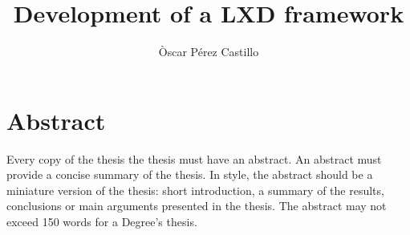 \documentclass[a4paper,12pt]{article}
\title{Development of a LXD framework}
\author{Òscar Pérez Castillo}
\begin{document}


\newpage
\tableofcontents

\newpage
\listoffigures
\newpage
\lstlistoflistings
\newpage
\listoftables

\newpage

\newpage
\section*{Abstract}
 {Every copy of the thesis the thesis must have an abstract. An abstract must provide a concise summary of the thesis. In style, the
  abstract should be a miniature version of the thesis: short introduction, a summary of the results, conclusions or main
  arguments presented in the thesis. The abstract may not exceed 150 words for a Degree’s thesis.}

\newpage




\newpage

\label{sec:introduction}


\label{sec:state}


\clearpage

\label{sec:methodology}

\clearpage

\label{sec:implementation}



\clearpage

\label{sec:budget}

\clearpage

\label{sec:conclusions}


\label{sec:futurework}




\newpage

\medskip



\end{document}
